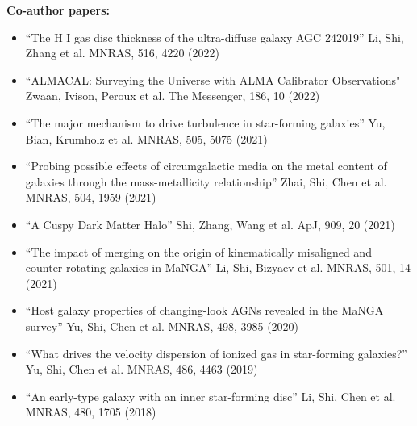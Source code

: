 \documentclass[A4,11pt]{article}
\newenvironment{paperlist}
{ \begin{itemize}[leftmargin=0.8cm, label={$\bullet$}]
    \setlength{\itemsep}{1pt}
    \setlength{\parskip}{1pt}
    \setlength{\parsep}{1pt}     }
{ \end{itemize}                  }
\begin{document}
{\bf Co-author papers:}\\
\vspace{-0.8em}
\begin{paperlist}
    \item ``The H I gas disc thickness of the ultra-diffuse galaxy AGC 242019” Li, Shi, Zhang et al. MNRAS, 516, 4220 (2022)
    \item ``ALMACAL: Surveying the Universe with ALMA Calibrator Observations" Zwaan, Ivison, Peroux et al. The Messenger, 186, 10 (2022)
    \item ``The major mechanism to drive turbulence in star-forming galaxies” Yu, Bian, Krumholz et al. MNRAS, 505, 5075 (2021)
    \item ``Probing possible effects of circumgalactic media on the metal content of galaxies through the mass-metallicity relationship” Zhai, Shi, Chen et al. MNRAS, 504, 1959 (2021)
    \item ``A Cuspy Dark Matter Halo” Shi, Zhang, Wang et al. ApJ, 909, 20 (2021)
    \item ``The impact of merging on the origin of kinematically misaligned and counter-rotating galaxies in MaNGA” Li, Shi, Bizyaev et al. MNRAS, 501, 14 (2021)
    \item ``Host galaxy properties of changing-look AGNs revealed in the MaNGA survey” Yu, Shi, Chen et al. MNRAS, 498, 3985 (2020)
    \item ``What drives the velocity dispersion of ionized gas in star-forming galaxies?” Yu, Shi, Chen et al. MNRAS, 486, 4463 (2019)
    \item ``An early-type galaxy with an inner star-forming disc” Li, Shi, Chen et al. MNRAS, 480, 1705 (2018)
\end{paperlist}
\end{document}
